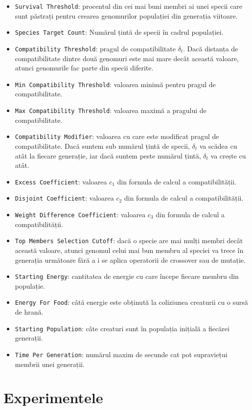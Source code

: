 \begin{itemize}
\item \texttt{Survival Threshold}: procentul din cei mai buni membri ai unei specii care sunt păstrați pentru crearea genomurilor populației din generația viitoare.
\item \texttt{Species Target Count}: Numărul țintă de specii în cadrul populației.
\item \texttt{Compatibility Threshold}: pragul de compatibilitate $\delta_t$. Dacă distanța de compatibilitate dintre două genomuri este mai mare decât această valoare, atunci genomurile fac parte din specii diferite.
\item \texttt{Min Compatibility Threshold}: valoarea minimă pentru pragul de compatibilitate.
\item \texttt{Max Compatibility Threshold}: valoarea maximă a pragului de compatibilitate.
\item \texttt{Compatibility Modifier}: valoarea cu care este modificat pragul de compatibilitate. Dacă suntem sub numărul țintă de specii, $\delta_t$ va scădea cu atât la fiecare generație, iar dacă suntem peste numărul țintă, $\delta_t$ va crește cu atât.
\item \texttt{Excess Coefficient}: valoarea $c_1$ din formula de calcul a compatibilității.
\item \texttt{Disjoint Coefficient}: valoarea $c_2$ din formula de calcul a compatibilității.
\item \texttt{Weight Difference Coefficient}: valoarea $c_3$ din formula de calcul a compatibilității.
\item \texttt{Top Members Selection Cutoff}: dacă o specie are mai mulți membri decât această valoare, atunci genomul celui mai bun membru al speciei va trece în generația următoare fără a i se aplica operatorii de crossover sau de mutație.
\item \texttt{Starting Energy}: cantitatea de energie cu care începe fiecare membru din populație.
\item \texttt{Energy For Food}: câtă energie este obținută la coliziunea creaturii cu o sursă de hrană.
\item \texttt{Starting Population}: câte creaturi sunt în populația inițială a fiecărei generații.
\item \texttt{Time Per Generation}: numărul maxim de secunde cat pot supraviețui membrii unei generații.
\end{itemize}

\section{Experimentele}
